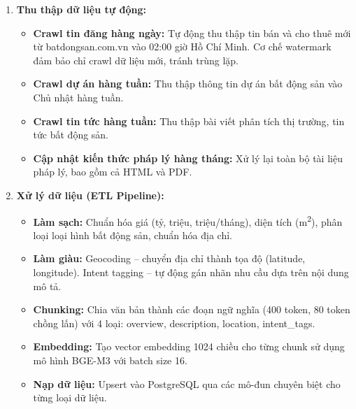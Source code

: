 \begin{enumerate}
    \item \textbf{Thu thập dữ liệu tự động:}
    \begin{itemize}
        \item \textbf{Crawl tin đăng hàng ngày:} Tự động thu thập tin bán và cho thuê mới từ batdongsan.com.vn vào 02:00 giờ Hồ Chí Minh. Cơ chế watermark đảm bảo chỉ crawl dữ liệu mới, tránh trùng lặp.
        \item \textbf{Crawl dự án hàng tuần:} Thu thập thông tin dự án bất động sản vào Chủ nhật hàng tuần.
        \item \textbf{Crawl tin tức hàng tuần:} Thu thập bài viết phân tích thị trường, tin tức bất động sản.
        \item \textbf{Cập nhật kiến thức pháp lý hàng tháng:} Xử lý lại toàn bộ tài liệu pháp lý, bao gồm cả HTML và PDF.
    \end{itemize}

    \item \textbf{Xử lý dữ liệu (ETL Pipeline):}
    \begin{itemize}
        \item \textbf{Làm sạch:} Chuẩn hóa giá (tỷ, triệu, triệu/tháng), diện tích (m\textsuperscript{2}), phân loại loại hình bất động sản, chuẩn hóa địa chỉ.
        \item \textbf{Làm giàu:} Geocoding -- chuyển địa chỉ thành tọa độ (latitude, longitude). Intent tagging -- tự động gán nhãn nhu cầu dựa trên nội dung mô tả.
        \item \textbf{Chunking:} Chia văn bản thành các đoạn ngữ nghĩa (400 token, 80 token chồng lấn) với 4 loại: overview, description, location, intent\_tags.
        \item \textbf{Embedding:} Tạo vector embedding 1024 chiều cho từng chunk sử dụng mô hình BGE-M3 với batch size 16.
        \item \textbf{Nạp dữ liệu:} Upsert vào PostgreSQL qua các mô-đun chuyên biệt cho từng loại dữ liệu.
    \end{itemize}


\end{enumerate}
